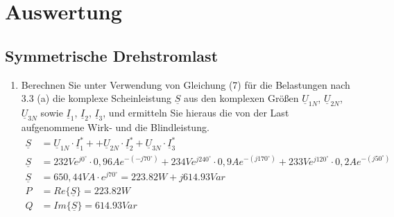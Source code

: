 \section{Auswertung}

\subsection{Symmetrische Drehstromlast }
\begin{enumerate}[label=\alph*)]
  \item Berechnen Sie unter Verwendung von Gleichung (7) für die Belastungen nach 3.3 (a) die komplexe Scheinleistung $\underline S$ aus den komplexen Größen $\underline U_{1N}$, $\underline U_{2N}$, $\underline U_{3N}$ sowie $\underline I_{1}$, $\underline I_{2}$, $\underline I_{3}$, und ermitteln Sie hieraus die von der Last aufgenommene Wirk- und die Blindleistung.
    \begin{align*}
      \underline S &= \underline U_{1N} \cdot \underline I_1^* + 
                      +\underline U_{2N} \cdot \underline I_2^*
                      +\underline U_{3N} \cdot \underline I_3^*\\
      \underline S &= 232Ve^{j0^\circ}\cdot 0,96Ae^{-(-j70^\circ)} + 234Ve^{j240^\circ}\cdot 0,9Ae^{-(j170^\circ)} + 233Ve^{j120^\circ}\cdot 0,2Ae^{-(j50^\circ)}\\ 
      \underline S &= 650,44 VA \cdot e^{j70^\circ} = 223.82 W + j614.93 Var\\
      P &= Re\{\underline S\} = 223.82 W \\
      Q &= Im\{\underline S\} = 614.93 Var
    \end{align*}
		

\end{enumerate}
